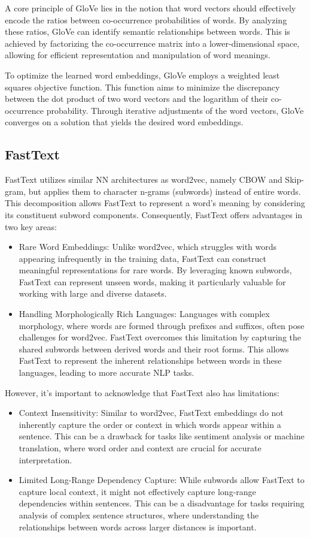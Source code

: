 A core principle of \ac{GloVe} lies in the notion that word vectors should effectively encode the ratios between co-occurrence probabilities of words.
By analyzing these ratios, \ac{GloVe} can identify semantic relationships between words.
This is achieved by factorizing the co-occurrence matrix into a lower-dimensional space, allowing for efficient representation and manipulation of word meanings.

To optimize the learned word embeddings, \ac{GloVe} employs a weighted least squares objective function.
This function aims to minimize the discrepancy between the dot product of two word vectors and the logarithm of their co-occurrence probability.
Through iterative adjustments of the word vectors, \ac{GloVe} converges on a solution that yields the desired word embeddings.

\subsection{FastText}
FastText \cite{bojanowski2017enriching} utilizes similar \ac{NN} architectures as word2vec, namely \ac{CBOW} and Skip-gram, but applies them to character n-grams (subwords) instead of entire words.
This decomposition allows FastText to represent a word's meaning by considering its constituent subword components.
Consequently, FastText offers advantages in two key areas:
\begin{itemize}
    \item Rare Word Embeddings: Unlike word2vec, which struggles with words appearing infrequently in the training data, FastText can construct meaningful representations for rare words. By leveraging known subwords, FastText can represent unseen words, making it particularly valuable for working with large and diverse datasets.    
    \item Handling Morphologically Rich Languages: Languages with complex morphology, where words are formed through prefixes and suffixes, often pose challenges for word2vec. FastText overcomes this limitation by capturing the shared subwords between derived words and their root forms. This allows FastText to represent the inherent relationships between words in these languages, leading to more accurate NLP tasks.
\end{itemize}
However, it's important to acknowledge that FastText also has limitations:
\begin{itemize}
    \item Context Insensitivity: Similar to word2vec, FastText embeddings do not inherently capture the order or context in which words appear within a sentence. This can be a drawback for tasks like sentiment analysis or machine translation, where word order and context are crucial for accurate interpretation.
    \item Limited Long-Range Dependency Capture: While subwords allow FastText to capture local context, it might not effectively capture long-range dependencies within sentences. This can be a disadvantage for tasks requiring analysis of complex sentence structures, where understanding the relationships between words across larger distances is important.    
\end{itemize}

